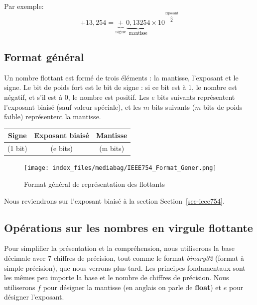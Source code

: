 \documentclass[
  letterpaper,
]{scrbook}
\theoremstyle{plain}
\theoremstyle{definition}
\theoremstyle{definition}
\theoremstyle{remark}
\begin{document}
Par exemple: \[
+13,254 = \underbrace{+}_{\text{signe}} \underbrace{0,13254}_{\text{mantisse}} \times 10^{\overbrace{{2}}^{\text{exposant}}}
\]

\hypertarget{format-guxe9nuxe9ral}{%
\subsection*{Format général}\label{format-guxe9nuxe9ral}}

Un nombre flottant est formé de trois éléments : la mantisse, l'exposant
et le signe. Le bit de poids fort est le bit de signe : si ce bit est à
1, le nombre est négatif, et s'il est à 0, le nombre est positif. Les
\(e\) bits suivants représentent l'exposant biaisé (sauf valeur
spéciale), et les \(m\) bits suivants (\(m\) bits de poids faible)
représentent la mantisse.

\begin{longtable}[]{@{}ccc@{}}
\toprule\noalign{}
\textbf{Signe} & \textbf{Exposant biaisé} & \textbf{Mantisse} \\
\midrule\noalign{}
\endhead
\bottomrule\noalign{}
\endlastfoot
(1 bit) & (e bits) & (m bits) \\
\end{longtable}

\begin{figure}

{\centering \texttt{[image: index\_files/mediabag/IEEE754\_Format\_Gener.png]}

}

\caption{Format général de représentation des flottants}

\end{figure}

Nous reviendrons sur l'exposant biaisé à la section
Section~\ref{sec-ieee754}.

\hypertarget{opuxe9rations-sur-les-nombres-en-virgule-flottante}{%
\subsection{Opérations sur les nombres en virgule
flottante}\label{opuxe9rations-sur-les-nombres-en-virgule-flottante}}

Pour simplifier la présentation et la compréhension, nous utiliserons la
base décimale avec 7 chiffres de précision, tout comme le format
\emph{binary32} (format à simple précision), que nous verrons plus tard.
Les principes fondamentaux sont les mêmes peu importe la base et le
nombre de chiffres de précision. Nous utiliserons \(f\) pour désigner la
mantisse (en anglais on parle de \textbf{float}) et \(e\) pour désigner
l'exposant.
\end{document}
